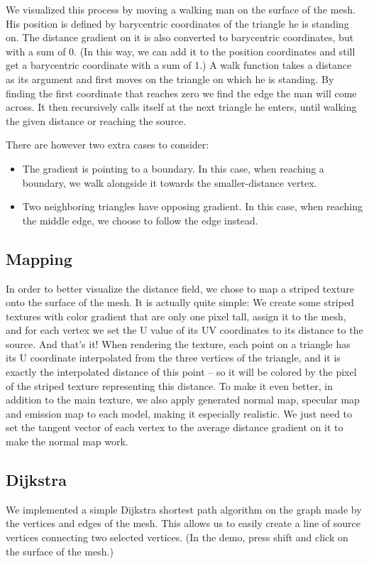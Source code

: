 \documentclass[a4paper,12pt,twoside]{article}
\begin{document}
We visualized this process by moving a walking man on the surface of the mesh. His position is defined by barycentric coordinates of the triangle he is standing on. The distance gradient on it is also converted to barycentric coordinates, but with a sum of 0. (In this way, we can add it to the position coordinates and still get a barycentric coordinate with a sum of 1.) A walk function takes a distance as its argument and first moves on the triangle on which he is standing. By finding the first coordinate that reaches zero we find the edge the man will come across. It then recursively calls itself at the next triangle he enters, until walking the given distance or reaching the source.


There are however two extra cases to consider:
\begin{itemize}
\item
The gradient is pointing to a boundary. In this case, when reaching a boundary, we walk alongside it towards the smaller-distance vertex.
\item
Two neighboring triangles have opposing gradient. In this case, when reaching the middle edge, we choose to follow the edge instead.
\end{itemize}

\subsection{Mapping}

In order to better visualize the distance field, we chose to map a striped texture onto the surface of the mesh. It is actually quite simple: We create some striped textures with color gradient that are only one pixel tall, assign it to the mesh, and for each vertex we set the U value of its UV coordinates to its distance to the source. And that’s it! When rendering the texture, each point on a triangle has its U coordinate interpolated from the three vertices of the triangle, and it is exactly the interpolated distance of this point – so it will be colored by the pixel of the striped texture representing this distance.
To make it even better, in addition to the main texture, we also apply generated normal map, specular map and emission map to each model, making it especially realistic. We just need to set the tangent vector of each vertex to the average distance gradient on it to make the normal map work.


\subsection{Dijkstra}
We implemented a simple Dijkstra shortest path algorithm on the graph made by the vertices and edges of the mesh. This allows us to easily create a line of source vertices connecting two selected vertices. (In the demo, press shift and click on the surface of the mesh.)
\end{document}
